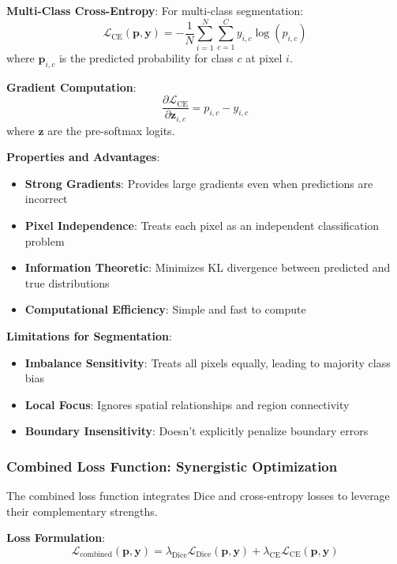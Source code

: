 \documentclass[12pt,a4paper]{article}
\begin{document}
\textbf{Multi-Class Cross-Entropy}:
For multi-class segmentation:
\begin{equation}
\mathcal{L}_{\text{CE}}(\mathbf{p}, \mathbf{y}) = -\frac{1}{N} \sum_{i=1}^N \sum_{c=1}^C y_{i,c} \log(p_{i,c})
\end{equation}
where $\mathbf{p}_{i,c}$ is the predicted probability for class $c$ at pixel $i$.

\textbf{Gradient Computation}:
\begin{equation}
\frac{\partial \mathcal{L}_{\text{CE}}}{\partial \mathbf{z}_{i,c}} = p_{i,c} - y_{i,c}
\end{equation}
where $\mathbf{z}$ are the pre-softmax logits.

\textbf{Properties and Advantages}:
\begin{itemize}
    \item \textbf{Strong Gradients}: Provides large gradients even when predictions are incorrect
    \item \textbf{Pixel Independence}: Treats each pixel as an independent classification problem
    \item \textbf{Information Theoretic}: Minimizes KL divergence between predicted and true distributions
    \item \textbf{Computational Efficiency}: Simple and fast to compute
\end{itemize}

\textbf{Limitations for Segmentation}:
\begin{itemize}
    \item \textbf{Imbalance Sensitivity}: Treats all pixels equally, leading to majority class bias
    \item \textbf{Local Focus}: Ignores spatial relationships and region connectivity
    \item \textbf{Boundary Insensitivity}: Doesn't explicitly penalize boundary errors
\end{itemize}

\subsubsection{Combined Loss Function: Synergistic Optimization}

The combined loss function integrates Dice and cross-entropy losses to leverage their complementary strengths.

\textbf{Loss Formulation}:
\begin{equation}
\mathcal{L}_{\text{combined}}(\mathbf{p}, \mathbf{y}) = \lambda_{\text{Dice}} \mathcal{L}_{\text{Dice}}(\mathbf{p}, \mathbf{y}) + \lambda_{\text{CE}} \mathcal{L}_{\text{CE}}(\mathbf{p}, \mathbf{y})
\end{equation}
\end{document}
